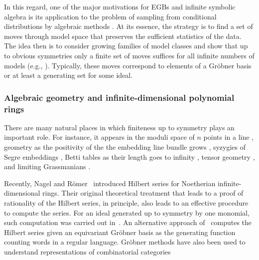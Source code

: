 In this regard, one of the major motivations for EGBs and infinite symbolic algebra is its application to the problem of sampling from conditional distributions by algebraic methods \cite{diaconis1998algebraic}.  At its essence, the strategy is to find a set of moves through model space that preserves the sufficient statistics of the data.   The idea then is to consider growing families of model classes and show that up to obvious symmetries only a finite set of moves suffices for all infinite numbers of models (e.g., \cite{aoki2003minimal, santos2003higher, hocsten2007finiteness, drton2007algebraic, Draisma08b, Brouwer09e, draisma2009ideals, hillar2012finite, draisma2015finiteness}).  Typically, these moves correspond to elements of a Gr\"obner basis or at least a generating set for some ideal.

\subsubsection{Algebraic geometry and infinite-dimensional polynomial rings}
There are many natural places in which finiteness up to symmetry plays an important role.  For instance, it appears in the moduli space of $n$ points in a line \cite{howard2009equations}, geometry as the positivity of the the embedding line bundle grows \cite{ein2012asymptotic}, syzygies of Segre embeddings \cite{snowden2013syzygies}, Betti tables as their length goes to infinity \cite{ein2015asymptotics}, tensor geometry \cite{draisma2014bounded, draisma2015finiteness}, and limiting Grassmanians \cite{draisma2015plucker}.

Recently, Nagel and R\"omer~\cite{Nagel} introduced Hilbert series for Noetherian infinite-dimensional rings. Their original theoretical treatment that leads to a proof of rationality of the Hilbert series, in principle, also leads to an effective procedure to compute the series. For an ideal generated up to symmetry by one monomial, such computation was carried out in~\cite{gunturkun2016equivariant}. An alternative approach of~\cite{krone2016hilbert} computes the Hilbert series given an equivariant Gr\"obner basis as the generating function counting words in a regular language.  Gr\"obner methods have also been used to understand representations of combinatorial categories \cite{sam2016grobner}


